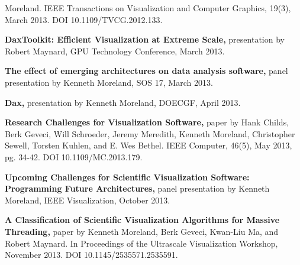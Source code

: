 \begin{description}
  Moreland. IEEE Transactions on Visualization and Computer Graphics,
  19(3), March 2013. DOI 10.1109/TVCG.2012.133.
\item\textbf{DaxToolkit: Efficient Visualization at Extreme Scale,}
  presentation by Robert Maynard, GPU Technology Conference, March 2013.
\item\textbf{The effect of emerging architectures on data analysis
  software,} panel presentation by Kenneth Moreland, SOS 17, March 2013.
\item\textbf{Dax,} presentation by Kenneth Moreland, DOECGF, April 2013.
\item\textbf{Research Challenges for Visualization Software,} paper by Hank
  Childs, Berk Geveci, Will Schroeder, Jeremy Meredith, Kenneth Moreland,
  Christopher Sewell, Torsten Kuhlen, and E. Wes Bethel. IEEE Computer,
  46(5), May 2013, pg. 34-42. DOI 10.1109/MC.2013.179.
\item\textbf{Upcoming Challenges for Scientific Visualization Software:
  Programming Future Architectures,} panel presentation by Kenneth
  Moreland, IEEE Visualization, October 2013.
\item\textbf{A Classification of Scientific Visualization Algorithms for
  Massive Threading,} paper by Kenneth Moreland, Berk Geveci, Kwan-Liu Ma,
  and Robert Maynard. In Proceedings of the Ultrascale Visualization
  Workshop, November 2013. DOI 10.1145/2535571.2535591.
\end{description}
